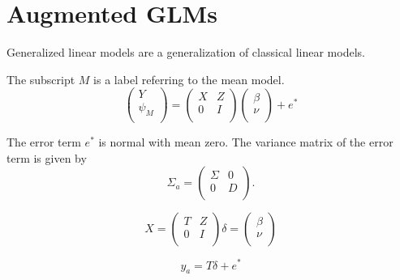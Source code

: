 \documentclass[Main.tex]{subfiles}
\begin{document}
\section{Augmented GLMs} %


Generalized linear models are a generalization of classical linear
models.

The subscript $M$ is a label referring to the mean model.
\begin{equation}
\left(%
\begin{array}{c}
Y \\
\psi_{M} \\
\end{array}%
\right) = \left(
\begin{array}{cc}
X & Z \\
0 & I \\
\end{array}\right) \left(%
\begin{array}{c}
\beta \\
\nu \\
\end{array}%
\right)+ e^{*}
\end{equation}




The error term $e^{*}$ is normal with mean zero. The variance matrix of the error term is given by
\begin{equation}
\Sigma_{a} = \left(%
\begin{array}{cc}
\Sigma & 0 \\
0 & D \\
\end{array}%
\right).
\end{equation}

\begin{equation}
X = \left(%
\begin{array}{cc}
T & Z \\
0 & I \\
\end{array}%
\right)
\delta = \left(%
\begin{array}{c}
\beta  \\
\nu  \\
\end{array}%
\right)
\end{equation}



\begin{equation}
y_{a} = T \delta + e^{*}
\end{equation}
\end{document}
